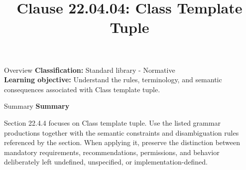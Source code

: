 \documentclass[10pt,letterpaper]{article}
\title{Clause 22.04.04: Class Template Tuple}
\author{}
\date{}
\begin{document}
\maketitle
\begin{CornellOverviewBox}{Overview}
\textbf{Classification:} Standard library - Normative\\[2pt]
\textbf{Learning objective:} Understand the rules, terminology, and semantic consequences associated with Class template tuple.
\end{CornellOverviewBox}\begin{CornellSummaryBox}{Summary}
{\sffamily\bfseries\color{Accent} Summary}\par\vspace{3pt}Section 22.4.4 focuses on Class template tuple. Use the listed grammar productions together with the semantic constraints and disambiguation rules referenced by the section. When applying it, preserve the distinction between mandatory requirements, recommendations, permissions, and behavior deliberately left undefined, unspecified, or implementation-defined.
\end{CornellSummaryBox}
\end{document}
